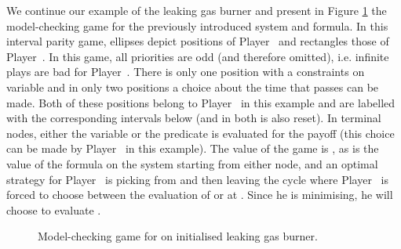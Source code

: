 \documentclass[fleqn,envcountsame]{LMCS}
\newcommand{\ie}{i.e.\xspace}
\newcommand{\pzero}{Player~\xspace}
\newcommand{\pone}{Player~\xspace}
\begin{document}
\begin{exa}
We continue our example of the leaking gas burner and present in
Figure \ref{fig-mcgame-example} the model-checking
game for the previously introduced system and formula.
In this interval parity game, ellipses depict positions of \pzero and rectangles
those of \pone. In this game, all priorities are odd (and therefore
omitted), \ie infinite plays are bad for \pzero.
There is only one position with a constraints on variable  and
in only two positions a choice about the time that passes can be made.
Both of these positions belong to \pzero in this example and are labelled
with the corresponding intervals below (and in both  is also reset).
In terminal nodes, either the variable  or the predicate
 is evaluated for the payoff (this choice can be made by \pone in this example).
The value of the game is , as is the value of the formula on the
system starting from either node, and an optimal strategy for
\pzero is picking  from  and then leaving the cycle
where \pone is forced to choose between the evaluation of
 or  at . Since he is minimising, he will choose
to evaluate .

\begin{figure}
\begin{center}
\end{center}
\caption{Model-checking game for  on initialised leaking gas burner.}
\label{fig-mcgame-example}
\end{figure}

\end{exa}
\end{document}
